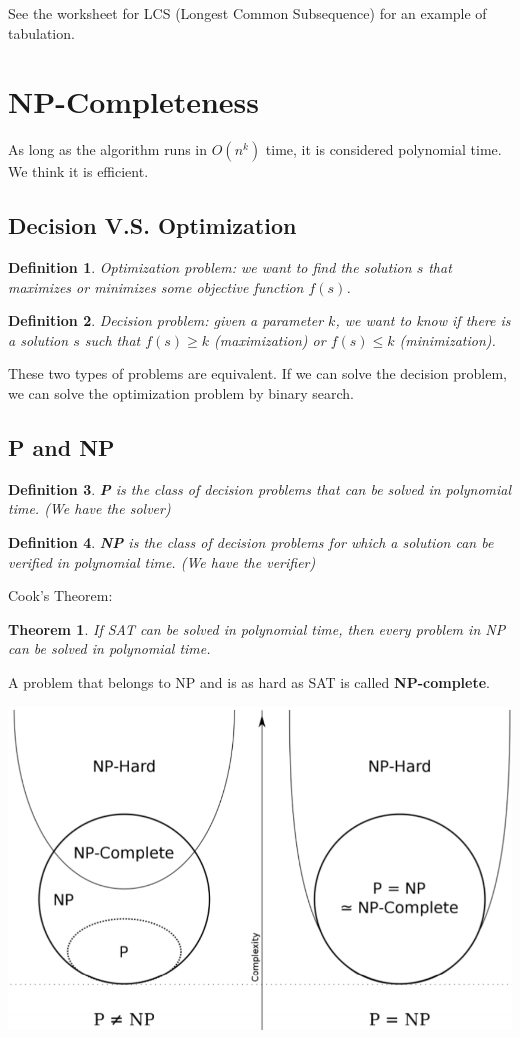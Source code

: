 \documentclass[11pt,fleqn]{article}
\newtheorem*{theorem}{Theorem}
\newtheorem*{definition}{Definition}
\begin{document}
See the worksheet for LCS (Longest Common Subsequence) for an example of tabulation.

\section{NP-Completeness}
As long as the algorithm runs in $O(n^k)$ time, it is considered polynomial time. We think it is efficient.

\subsection{Decision V.S. Optimization}
\begin{definition}
    Optimization problem: we want to find the solution $s$ that maximizes or minimizes some objective function $f(s)$.
\end{definition}
\begin{definition}
    Decision problem: given a parameter $k$, we want to know if there is a solution $s$ such that $f(s) \geq k$ (maximization) or $f(s) \leq k$ (minimization).
\end{definition}
These two types of problems are equivalent. If we can solve the decision problem, we can solve the optimization problem by binary search.
\subsection{P and NP}
\begin{definition}
    \textbf{P} is the class of decision problems that can be solved in polynomial time. (We have the solver)
\end{definition}
\begin{definition}
    \textbf{NP} is the class of decision problems for which a solution can be verified in polynomial time. (We have the verifier)
\end{definition}

Cook's Theorem: \begin{theorem}
    If SAT can be solved in polynomial time, then every problem in NP can be solved in polynomial time.
\end{theorem}

A problem that belongs to NP and is as hard as SAT is called \textbf{NP-complete}.

\includegraphics*[scale = 0.5]{./Images/NP-Complete.png}
\end{document}

